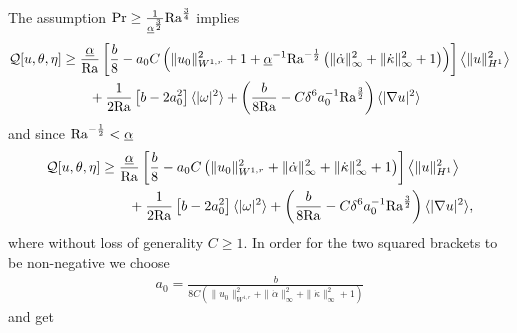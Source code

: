 \documentclass{article}
\theoremstyle{definition}
\theoremstyle{definition}
\newcommand{\Pra}{\rm{Pr}}
\newcommand{\Ra}{{\rm{Ra}}}
\begin{document}
\begin{itemize}
\begin{align*}
        \end{align*}
        The assumption $\Pra\geq \frac{1}{\underline{\alpha}^\frac{3}{2}}\Ra^\frac{3}{4}$ implies
        \begin{align*}
            \mathcal{Q}[u,\theta,\eta] &\geq \frac{\underline{\alpha}}{\Ra} \left[\frac{b}{8} - a_0 C \left(\|u_0\|_{W^{1,r}}^2+1+\underline{\alpha}^{-1}\Ra^{-\frac{1}{2}}\left(\|\dot\alpha\|_\infty^2+\|\dot\kappa\|_\infty^2+1\right)\right) \right]\left\langle\|u\|_{H^1}^2\right\rangle
            \\
            &\qquad + \frac{1}{2\Ra}\left[b- 2a_0^2\right]  \langle |\omega|^2\rangle + \left(\frac{b}{8\Ra}-C\delta^6 a_0^{-1}\Ra^\frac{3}{2}\right) \langle |\nabla u|^2\rangle
        \end{align*}
        and since $\Ra^{-\frac{1}{2}}<\underline{\alpha}$
        \begin{align*}
            \mathcal{Q}[u,\theta,\eta] &\geq \frac{\underline{\alpha}}{\Ra} \left[\frac{b}{8} - a_0 C \left(\|u_0\|_{W^{1,r}}^2+\|\dot\alpha\|_\infty^2+\|\dot\kappa\|_\infty^2+1\right) \right]\left\langle\|u\|_{H^1}^2\right\rangle
            \\
            &\qquad + \frac{1}{2\Ra}\left[b- 2a_0^2\right]  \langle |\omega|^2\rangle + \left(\frac{b}{8\Ra}-C\delta^6 a_0^{-1}\Ra^\frac{3}{2}\right) \langle |\nabla u|^2\rangle,
        \end{align*}
        where without loss of generality $C\geq 1$. In order for the two squared brackets to be non-negative we choose
        \begin{align*}
            a_0 = \frac{b}{8C\left(\|u_0\|_{W^{1,r}}^2+\|\dot\alpha\|_\infty^2+\|\dot\kappa\|_\infty^2+1\right)}
        \end{align*}
        and get
        \begin{align*}

\end{align*}
\end{itemize}
\end{document}
